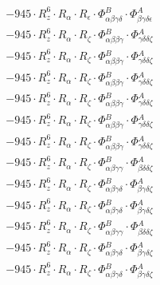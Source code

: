 \documentclass{article}
\begin{document}
\begin{subequations}
\begin{gather}
\begin{array}{c}
 \\[0.2em] 		 - 945 \cdot R_{z}^{6} \cdot R_{\alpha{}} \cdot R_{\epsilon{}} \cdot \Phi{}^{B}_{\alpha{}\beta{}\gamma{}\delta{}} \cdot \Phi{}^{A}_{\beta{}\gamma{}\delta{}\epsilon{}} 
 \\[0.2em] 		 - 945 \cdot R_{z}^{6} \cdot R_{\alpha{}} \cdot R_{\zeta{}} \cdot \Phi{}^{B}_{\alpha{}\beta{}\beta{}\gamma{}} \cdot \Phi{}^{A}_{\gamma{}\delta{}\delta{}\zeta{}} 
 \\[0.2em] 		 - 945 \cdot R_{z}^{6} \cdot R_{\alpha{}} \cdot R_{\zeta{}} \cdot \Phi{}^{B}_{\alpha{}\beta{}\beta{}\gamma{}} \cdot \Phi{}^{A}_{\gamma{}\delta{}\delta{}\zeta{}} 
 \\[0.2em] 		 - 945 \cdot R_{z}^{6} \cdot R_{\alpha{}} \cdot R_{\zeta{}} \cdot \Phi{}^{B}_{\alpha{}\beta{}\beta{}\gamma{}} \cdot \Phi{}^{A}_{\gamma{}\delta{}\delta{}\zeta{}} 
 \\[0.2em] 		 - 945 \cdot R_{z}^{6} \cdot R_{\alpha{}} \cdot R_{\zeta{}} \cdot \Phi{}^{B}_{\alpha{}\beta{}\beta{}\gamma{}} \cdot \Phi{}^{A}_{\gamma{}\delta{}\delta{}\zeta{}} 
 \\[0.2em] 		 - 945 \cdot R_{z}^{6} \cdot R_{\alpha{}} \cdot R_{\zeta{}} \cdot \Phi{}^{B}_{\alpha{}\beta{}\beta{}\gamma{}} \cdot \Phi{}^{A}_{\gamma{}\delta{}\delta{}\zeta{}} 
 \\[0.2em] 		 - 945 \cdot R_{z}^{6} \cdot R_{\alpha{}} \cdot R_{\zeta{}} \cdot \Phi{}^{B}_{\alpha{}\beta{}\beta{}\gamma{}} \cdot \Phi{}^{A}_{\gamma{}\delta{}\delta{}\zeta{}} 
 \\[0.2em] 		 - 945 \cdot R_{z}^{6} \cdot R_{\alpha{}} \cdot R_{\zeta{}} \cdot \Phi{}^{B}_{\alpha{}\beta{}\gamma{}\gamma{}} \cdot \Phi{}^{A}_{\beta{}\delta{}\delta{}\zeta{}} 
 \\[0.2em] 		 - 945 \cdot R_{z}^{6} \cdot R_{\alpha{}} \cdot R_{\zeta{}} \cdot \Phi{}^{B}_{\alpha{}\beta{}\gamma{}\delta{}} \cdot \Phi{}^{A}_{\beta{}\gamma{}\delta{}\zeta{}} 
 \\[0.2em] 		 - 945 \cdot R_{z}^{6} \cdot R_{\alpha{}} \cdot R_{\zeta{}} \cdot \Phi{}^{B}_{\alpha{}\beta{}\gamma{}\delta{}} \cdot \Phi{}^{A}_{\beta{}\gamma{}\delta{}\zeta{}} 
 \\[0.2em] 		 - 945 \cdot R_{z}^{6} \cdot R_{\alpha{}} \cdot R_{\zeta{}} \cdot \Phi{}^{B}_{\alpha{}\beta{}\gamma{}\gamma{}} \cdot \Phi{}^{A}_{\beta{}\delta{}\delta{}\zeta{}} 
 \\[0.2em] 		 - 945 \cdot R_{z}^{6} \cdot R_{\alpha{}} \cdot R_{\zeta{}} \cdot \Phi{}^{B}_{\alpha{}\beta{}\gamma{}\delta{}} \cdot \Phi{}^{A}_{\beta{}\gamma{}\delta{}\zeta{}} 
 \\[0.2em] 		 - 945 \cdot R_{z}^{6} \cdot R_{\alpha{}} \cdot R_{\zeta{}} \cdot \Phi{}^{B}_{\alpha{}\beta{}\gamma{}\delta{}} \cdot \Phi{}^{A}_{\beta{}\gamma{}\delta{}\zeta{}} 

\end{array}
\end{gather}
\end{subequations}
\end{document}
